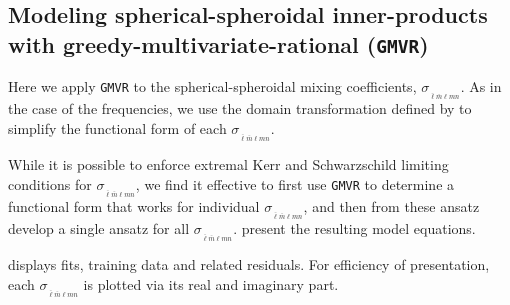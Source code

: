 \documentclass[twocolumn,aps,prd,floatfix,preprintnumbers,a4paper,nofootinbib,
superscriptaddress,10pt]{revtex4-1}
\def\LMlmn{_{\bar{\ell} \bar{m} \ell m n}}
\def\gmvr#1{greedy-multivariate-rational#1
  (\texttt{GMVR}#1)\gdef\gmvr{\texttt{GMVR}}}
\begin{document}
\subsection{Modeling spherical-spheroidal inner-products with \gmvr{}}
%
%
Here we apply \gmvr{} to the spherical-spheroidal mixing coefficients, $\sigma_{\LMlmn}$.
%
As in the case of the \qnm{} frequencies, we use the domain transformation defined by  to simplify the functional form of each $\sigma_{\LMlmn}$.
%
\par While it is possible to enforce extremal Kerr and Schwarzschild limiting conditions for $\sigma_{\LMlmn}$, we find it effective to first use \gmvr{} to determine a functional form that works for {individual} $\sigma_{\LMlmn}$, and then from these ansatz develop a single ansatz for all $\sigma_{\LMlmn}$.
%
 present the resulting model equations.
%
%
\par {} displays fits, training data and related residuals.
%
For efficiency of presentation, each $\sigma_{\LMlmn}$ is plotted via its real and imaginary part.
%
\end{document}
